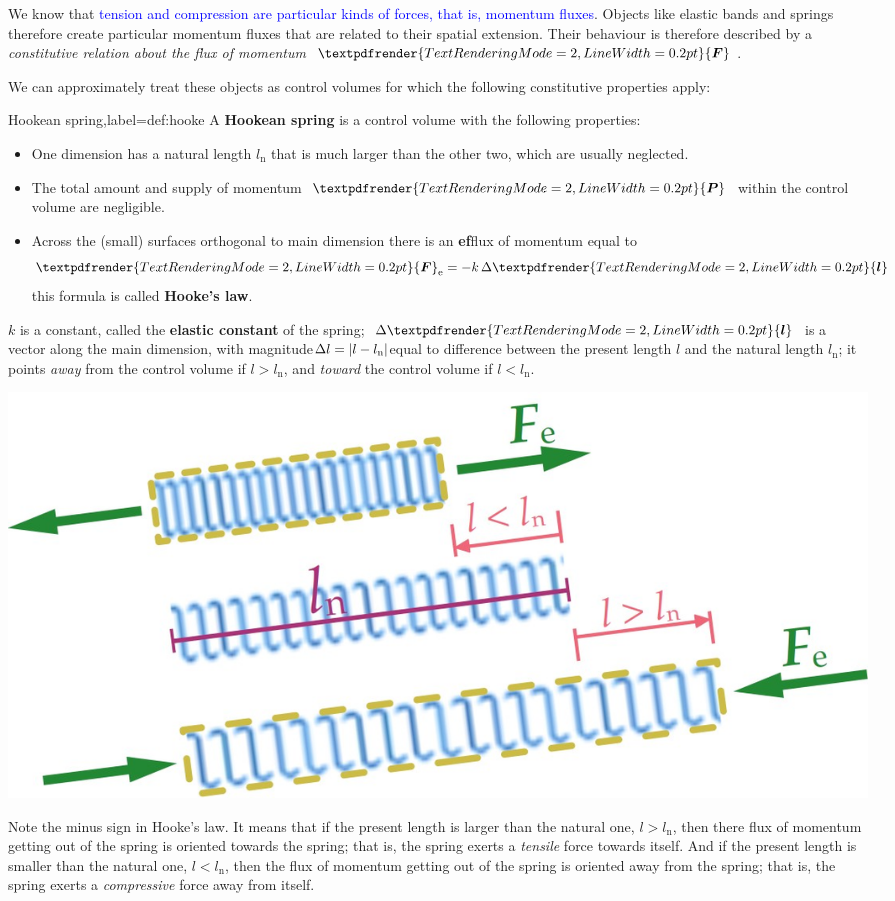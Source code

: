 \documentclass[a4paper,12pt,%
onecolumn,oneside,%
british%
]{memoir}
\renewcommand*{\bm}[1]{\textpdfrender{TextRenderingMode=2,LineWidth=0.2pt}{\boldsymbol{#1}}}
\newcommand*{\incr}{\Delta}%
\DeclarePairedDelimiter\abs{\lvert}{\rvert}
\renewcommand*{\|}[1][]{\nonscript\:#1\vert\nonscript\:\mathopen{}}
\newcommand*{\sect}{\S}%
\renewcommand*{\autoref}[2]{\sidepar{\vspace{-1ex}\footnotesize{\color{blue}\faIcon{%
angle-right%
}\enskip\sect~\ref{#1} page~\pageref{#1}}}\textcolor{blue}{#2}}
\newcommand*{\ylo}{l_{\textrm{n}}}
\newcommand*{\yle}{l}
\newcommand*{\ydl}{\incr\bm{l}}
\newcommand*{\ydlm}{\incr l}
\newcommand*{\yP}{\bm{P}}
\newcommand*{\yF}{\bm{F}}
\begin{document}
We know that \autoref{sec:pressure_tension_shear}{tension and compression are particular kinds of forces, that is, momentum fluxes}. Objects like elastic bands and springs therefore create particular momentum fluxes that are related to their spatial extension. Their behaviour is therefore described by a \emph{constitutive relation about the flux of momentum $\yF$}.

We can approximately treat these objects as control volumes for which the following constitutive properties apply:
\begin{definition}{Hookean spring,label={def:hooke}}
  A \textbf{Hookean spring} is a control volume with the following properties:
  \begin{itemize}
  \item One dimension has a natural length $\ylo$ that is much larger than the other two, which are usually neglected.
  \item The total amount and supply of momentum $\yP$ within the control volume are negligible.
  \item Across the (small) surfaces orthogonal to main dimension there is an \textbf{ef}flux of momentum equal to
    \begin{equation}
      \label{eq:hooke}
      \yF_{\textrm{e}} = -k\,\ydl
    \end{equation}
    this formula is called \textbf{Hooke's law}.
  \end{itemize}
  $k$ is a constant, called the \textbf{elastic constant} of the spring; $\ydl$ is a vector along the main dimension, with magnitude\enskip$\ydlm = \abs{\yle-\ylo}$\enskip equal to difference between the present length $\yle$ and the natural length $\ylo$; it points \emph{away} from the control volume if $\yle>\ylo$, and \emph{toward} the control volume if $\yle<\ylo$.
  \begin{center}
\includegraphics[width=0.67\linewidth]{images/hooke3.jpg}%
  \end{center}
\end{definition}
%
Note the minus sign in Hooke's law. It means that if the present length is larger than the natural one, $\yle > \ylo$, then there flux of momentum getting out of the spring is oriented towards the spring; that is, the spring exerts a \emph{tensile} force towards itself. And if the present length is smaller than the natural one, $\yle < \ylo$, then the flux of momentum getting out of the spring is oriented away from the spring; that is, the spring exerts a \emph{compressive} force away from itself.
\end{document}
